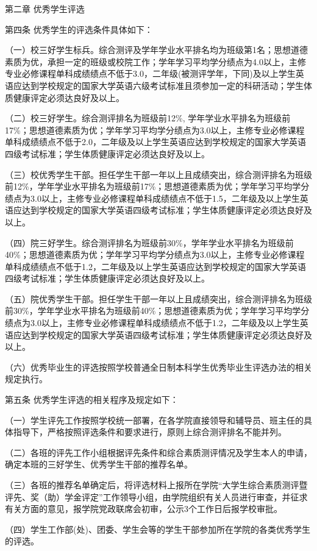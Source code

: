 \documentclass[UTF8,12pt,a4paper]{report}
\begin{document}
第二章  优秀学生评选

第四条  优秀学生的评选条件具体如下：

（一）校三好学生标兵。综合测评及学年学业水平排名均为班级第1名；思想道德素质为优，承担一定的班级或校院工作；学年学习平均学分绩点为4.0以上，主修专业必修课程单科成绩绩点不低于3.0，二年级(被测评学年，下同)及以上学生英语应达到学校规定的国家大学英语六级考试标准且须参加一定的科研活动；学生体质健康评定必须达良好及以上。

（二）校三好学生。综合测评排名为班级前12\%, 学年学业水平排名为班级前17\%；思想道德素质为优；学年学习平均学分绩点为3.0以上，主修专业必修课程单科成绩绩点不低于2.0，二年级及以上学生英语应达到学校规定的国家大学英语四级考试标准；学生体质健康评定必须达良好及以上。

（三）校优秀学生干部。担任学生干部一年以上且成绩突出，综合测评排名为班级前12\%，学年学业水平排名为班级前17\%；思想道德素质为优；学年学习平均学分绩点为3.0以上，主修专业必修课程单科成绩绩点不低于1.5，二年级及以上学生英语应达到学校规定的国家大学英语四级考试标准；学生体质健康评定必须达良好及以上。

（四）院三好学生。综合测评排名为班级前30\%，学年学业水平排名为班级前40\%；思想道德素质为优；学年学习平均学分绩点为3.0以上，主修专业必修课程单科成绩绩点不低于1.2，二年级及以上学生英语应达到学校规定的国家大学英语四级考试标准；学生体质健康评定必须达良好及以上。

（五）院优秀学生干部。担任学生干部一年以上且成绩突出，综合测评排名为班级前30\%，学年学业水平排名为班级前40\%；思想道德素质为优；学年学习平均学分绩点为3.0以上，主修专业必修课程单科成绩绩点不低于1.2，二年级及以上学生英语应达到学校规定的国家大学英语四级考试标准；学生体质健康评定必须达良好及以上。

（六）优秀毕业生的评选按照学校普通全日制本科学生优秀毕业生评选办法的相关规定执行。

第五条  优秀学生评选的相关程序及规定如下：

（一）学生评先工作按照学校统一部署，在各学院直接领导和辅导员、班主任的具体指导下，严格按照评选条件和要求进行，原则上综合测评排名不能并列。

（二）各班的评先工作小组根据评先条件和综合素质测评情况及学生本人的申请，确定本班的三好学生、优秀学生干部的推荐名单。

（三）各班的推荐名单确定后，将评选材料上报所在学院“大学生综合素质测评暨评先、奖（助）学金评定”工作领导小组，由学院组织有关人员进行审查，并征求有关方面的意见，报学院党政联席会初审，公示3个工作日后报学校审批。

（四）学生工作部(处)、团委、学生会等的学生干部参加所在学院的各类优秀学生的评选。
\end{document}
